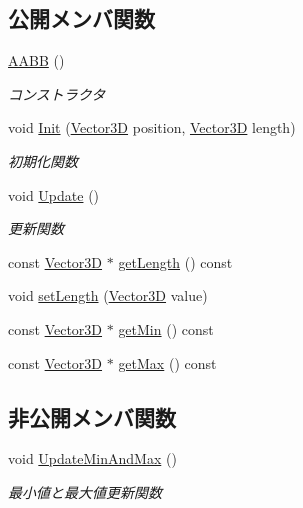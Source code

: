 \subsection*{公開メンバ関数}
\begin{DoxyCompactItemize}
\item 
\mbox{\hyperlink{class_a_a_b_b_a5f5baf6c533905aa1456b3a3eb57bab2}{A\+A\+BB}} ()
\begin{DoxyCompactList}\small\item\em コンストラクタ \end{DoxyCompactList}\item 
void \mbox{\hyperlink{class_a_a_b_b_a28167704c3b21de2ae9f70ac139781c4}{Init}} (\mbox{\hyperlink{class_vector3_d}{Vector3D}} position, \mbox{\hyperlink{class_vector3_d}{Vector3D}} length)
\begin{DoxyCompactList}\small\item\em 初期化関数 \end{DoxyCompactList}\item 
void \mbox{\hyperlink{class_a_a_b_b_a9698fec7358275832b6b84a146ea4a7c}{Update}} ()
\begin{DoxyCompactList}\small\item\em 更新関数 \end{DoxyCompactList}\item 
const \mbox{\hyperlink{class_vector3_d}{Vector3D}} $\ast$ \mbox{\hyperlink{class_a_a_b_b_a74b2c6a6acde4bf37eb0333358349fca}{get\+Length}} () const
\item 
void \mbox{\hyperlink{class_a_a_b_b_a76816b1eb872408d91dfa6880e5af109}{set\+Length}} (\mbox{\hyperlink{class_vector3_d}{Vector3D}} value)
\item 
const \mbox{\hyperlink{class_vector3_d}{Vector3D}} $\ast$ \mbox{\hyperlink{class_a_a_b_b_a9a18cef6c33dd579c144700c79ea39f5}{get\+Min}} () const
\item 
const \mbox{\hyperlink{class_vector3_d}{Vector3D}} $\ast$ \mbox{\hyperlink{class_a_a_b_b_a8dc63902fbb2c8f83185bbe9feaaa4b0}{get\+Max}} () const
\end{DoxyCompactItemize}
\subsection*{非公開メンバ関数}
\begin{DoxyCompactItemize}
\item 
void \mbox{\hyperlink{class_a_a_b_b_aad10f509f6726aed8285063a69df9085}{Update\+Min\+And\+Max}} ()
\begin{DoxyCompactList}\small\item\em 最小値と最大値更新関数 \end{DoxyCompactList}\end{DoxyCompactItemize}
